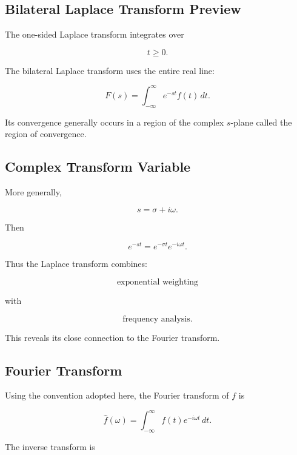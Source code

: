 \subsection{Bilateral Laplace Transform Preview}
\label{subsec:bilateral-laplace-preview}

The one-sided Laplace transform integrates over

\[
t\geq0.
\]

The bilateral Laplace transform uses the entire real line:

\[
\boxed{
F(s)
=
\int_{-\infty}^{\infty}
e^{-st}
f(t)\,dt.
}
\]

Its convergence generally occurs in a region of the complex \(s\)-plane
called the region of convergence.

\subsection{Complex Transform Variable}
\label{subsec:complex-laplace-variable}

More generally,

\[
\boxed{
s
=
\sigma+i\omega.
}
\]

Then

\[
e^{-st}
=
e^{-\sigma t}
e^{-i\omega t}.
\]

Thus the Laplace transform combines:

\[
\boxed{
\text{exponential weighting}
}
\]

with

\[
\boxed{
\text{frequency analysis}.
}
\]

This reveals its close connection to the Fourier transform.

\subsection{Fourier Transform}
\label{subsec:fourier-transform}

Using the convention adopted here, the Fourier transform of \(f\) is

\[
\boxed{
\widehat{f}(\omega)
=
\int_{-\infty}^{\infty}
f(t)e^{-i\omega t}\,dt.
}
\]

The inverse transform is

